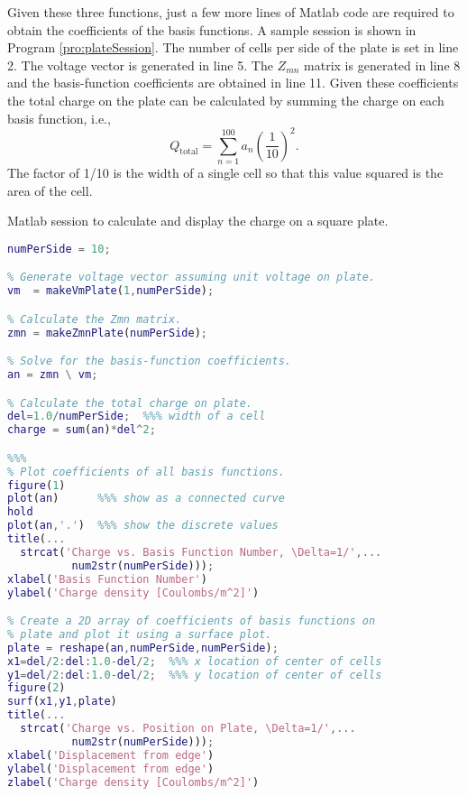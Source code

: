 Given these three functions, just a few more lines of Matlab code are
required to obtain the coefficients of the basis functions.  A sample
session is shown in Program \ref{pro:plateSession}.  The number of
cells per side of the plate is set in line 2.  The voltage vector is
generated in line 5.  The $Z_{mn}$ matrix is generated in line 8 and
the basis-function coefficients are obtained in line 11.  Given
these coefficients the total charge on the plate can be calculated by
summing the charge on each basis function, i.e., 
\begin{equation}
  Q_{\text{total}} = \sum_{n=1}^{100} a_n \left(\frac{1}{10}\right)^2.
\end{equation}
The factor of 1/10 is the width of a single cell so that this value
squared is the area of the cell. 
\begin{program}
Matlab session to calculate and display the charge on a
square plate. \label{pro:plateSession}
\codemiddle
\begin{lstlisting}[language=Matlab]
% Set the number of cells per side of the plate.
numPerSide = 10;

% Generate voltage vector assuming unit voltage on plate.
vm  = makeVmPlate(1,numPerSide);

% Calculate the Zmn matrix.
zmn = makeZmnPlate(numPerSide);

% Solve for the basis-function coefficients.
an = zmn \ vm;

% Calculate the total charge on plate.
del=1.0/numPerSide;  %%% width of a cell
charge = sum(an)*del^2;

%%%
% Plot coefficients of all basis functions.
figure(1)
plot(an)      %%% show as a connected curve
hold
plot(an,'.')  %%% show the discrete values
title(...
  strcat('Charge vs. Basis Function Number, \Delta=1/',...
          num2str(numPerSide)));
xlabel('Basis Function Number')
ylabel('Charge density [Coulombs/m^2]')

% Create a 2D array of coefficients of basis functions on
% plate and plot it using a surface plot.
plate = reshape(an,numPerSide,numPerSide);
x1=del/2:del:1.0-del/2;  %%% x location of center of cells
y1=del/2:del:1.0-del/2;  %%% y location of center of cells
figure(2)
surf(x1,y1,plate)
title(...
  strcat('Charge vs. Position on Plate, \Delta=1/',...
          num2str(numPerSide)));
xlabel('Displacement from edge')
ylabel('Displacement from edge')
zlabel('Charge density [Coulombs/m^2]')
\end{lstlisting}
\end{program}

